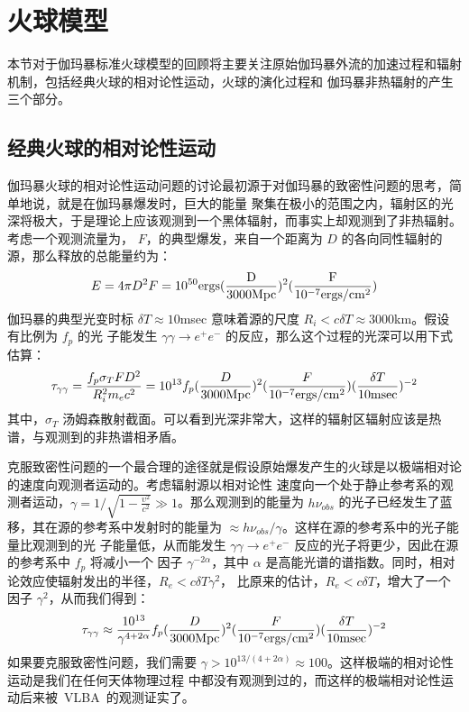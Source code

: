 	\section{火球模型}

	本节对于伽玛暴标准火球模型的回顾将主要关注原始伽玛暴外流的加速过程和辐射机制，包括经典火球的相对论性运动，火球的演化过程和
	伽玛暴非热辐射的产生三个部分。

	\subsection{经典火球的相对论性运动}

	伽玛暴火球的相对论性运动问题的讨论最初源于对伽玛暴的致密性问题的思考，简单地说，就是在伽玛暴爆发时，巨大的能量
	聚集在极小的范围之内，辐射区的光深将极大，于是理论上应该观测到一个黑体辐射，而事实上却观测到了非热辐射。考虑一个观测流量为，
	$F$，的典型爆发，来自一个距离为 $D$ 的各向同性辐射的源，那么释放的总能量约为：
	\begin{equation}
	E=4\pi D^{2}F=10^{50}\rm{ergs}(\frac{D}{3000\rm{Mpc}})^{2}(\frac{F}{10^{-7}\rm{ergs/cm^{2}}})
	\end{equation}
	伽玛暴的典型光变时标 $\delta T\approx10$msec 意味着源的尺度 $R_{i}<c\delta T\approx3000$km。假设有比例为 $f_{p}$ 的光
	子能发生 $\gamma\gamma\rightarrow e^{+}e^{-}$ 的反应，那么这个过程的光深可以用下式估算：
	\begin{equation}
	\tau_{\gamma\gamma}=\frac{f_{p}\sigma_{T}FD^{2}}{R^{2}_{i}m_{e}c^{2}}=10^{13}f_{p}(\frac{D}{3000\rm{Mpc}})^{2}(\frac{F}{10^{-7}\rm{ergs/cm^{2}}})(\frac{\delta T}{10\rm{msec}})^{-2}
	\end{equation}
	其中，$\sigma_{T}$ 汤姆森散射截面。可以看到光深非常大，这样的辐射区辐射应该是热谱，与观测到的非热谱相矛盾。

	克服致密性问题的一个最合理的途径就是假设原始爆发产生的火球是以极端相对论的速度向观测者运动的。考虑辐射源以相对论性
	速度向一个处于静止参考系的观测者运动，$\gamma=1/\sqrt{1-\frac{\upsilon^{2}}{c^{2}}}\gg1$。那么观测到的能量为 $h\nu_{obs}$
	的光子已经发生了蓝移，其在源的参考系中发射时的能量为 $\approx h\nu_{obs}/\gamma$。这样在源的参考系中的光子能量比观测到的光
	子能量低，从而能发生 $\gamma\gamma\rightarrow e^{+}e^{-}$ 反应的光子将更少，因此在源的参考系中 $f_{p}$ 将减小一个
	因子 $\gamma^{-2\alpha}$，其中 $\alpha$ 是高能光谱的谱指数。同时，相对论效应使辐射发出的半径，$R_{e}<c\delta T\gamma^{2}$，
	比原来的估计，$R_{e}<c\delta T$，增大了一个因子 $\gamma^{2}$，从而我们得到：
	\begin{equation}
	\tau_{\gamma\gamma}\approx\frac{10^{13}}{\gamma^{4+2\alpha}}f_{p}(\frac{D}{3000\rm{Mpc}})^{2}(\frac{F}{10^{-7}\rm{ergs/cm^{2}}})(\frac{\delta T}{10\rm{msec}})^{-2}
	\end{equation}
	如果要克服致密性问题，我们需要 $\gamma>10^{13/(4+2\alpha)}\approx100$。这样极端的相对论性运动是我们在任何天体物理过程
	中都没有观测到过的，而这样的极端相对论性运动后来被~VLBA~的观测证实了。

